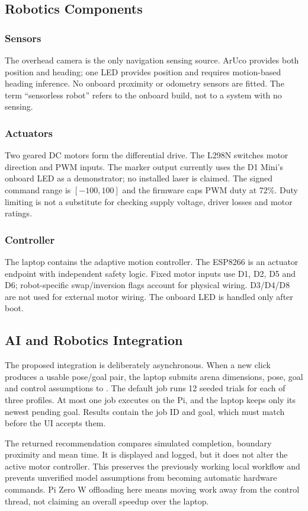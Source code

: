 \documentclass[11pt,a4paper]{article}
\newcommand{\code}[1]{\texttt{\detokenize{#1}}}
\begin{document}
\subsection{Robotics Components}
\subsubsection*{Sensors}
The overhead camera is the only navigation sensing source. ArUco provides both
position and heading; one LED provides position and requires motion-based heading
inference. No onboard proximity or odometry sensors are fitted. The term
``sensorless robot'' refers to the onboard build, not to a system with no sensing.

\subsubsection*{Actuators}
Two geared DC motors form the differential drive. The L298N switches motor
direction and PWM inputs. The marker output currently uses the D1 Mini's onboard
LED as a demonstrator; no installed laser is claimed. The signed command range is
$[-100,100]$ and the firmware caps PWM duty at 72\%. Duty limiting is not a
substitute for checking supply voltage, driver losses and motor ratings.

\subsubsection*{Controller}
The laptop contains the adaptive motion controller. The ESP8266 is an actuator
endpoint with independent safety logic. Fixed motor inputs use D1, D2, D5 and D6;
robot-specific swap/inversion flags account for physical wiring. D3/D4/D8 are not
used for external motor wiring. The onboard LED is handled only after boot.

\subsection{AI and Robotics Integration}
The proposed integration is deliberately asynchronous. When a new click produces
a usable pose/goal pair, the laptop submits arena dimensions, pose, goal and
control assumptions to \code{/evaluate}. The default job runs 12 seeded trials
for each of three profiles. At most one job executes on the Pi, and the laptop
keeps only its newest pending goal. Results contain the job ID and goal, which
must match before the UI accepts them.

The returned recommendation compares simulated completion, boundary proximity and
mean time. It is displayed and logged, but it does not alter the active motor
controller. This preserves the previously working local workflow and prevents
unverified model assumptions from becoming automatic hardware commands. Pi Zero W
offloading here means moving work away from the control thread, not claiming an
overall speedup over the laptop.
\end{document}
